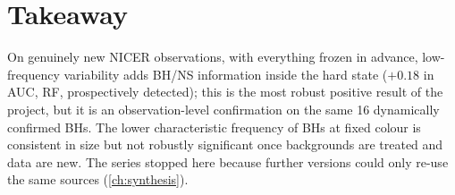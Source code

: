 \section{Takeaway}
On genuinely new NICER observations, with everything frozen in advance, low-frequency variability adds BH/NS information inside the hard
state ($+0.18$ in AUC, RF, prospectively detected); this is the most robust positive result of the project, but it is an observation-level
confirmation on the same 16 dynamically confirmed BHs. The lower characteristic frequency of BHs at fixed colour is consistent in size
but not robustly significant once backgrounds are treated and data are new. The series stopped here because further versions could only
re-use the same sources (\cref{ch:synthesis}).
